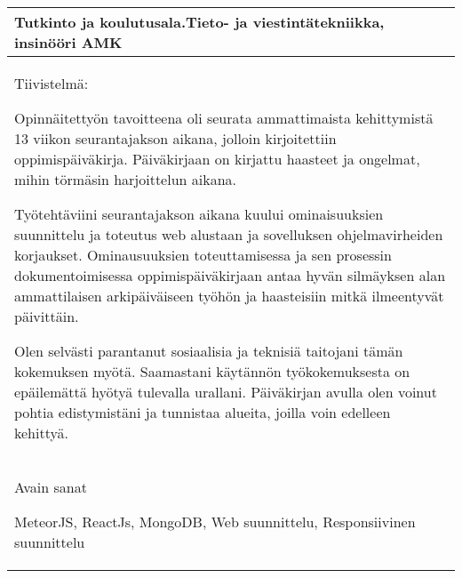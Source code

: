 \begin{tabular}{ | l | }
    \begin{minipage}[t][1.5cm][t]{10cm}
    Tutkinto ja koulutusala.\newline  Tieto- ja viestintätekniikka, insinööri AMK  

    \end{minipage}\\ \hline

    \begin{minipage}[t][7.5cm][t]{14.5cm}
    Tiivistelmä: \medskip 
    
    Opinnäitettyön tavoitteena oli seurata ammattimaista kehittymistä 13 viikon seurantajakson aikana, 
        jolloin kirjoitettiin oppimispäiväkirja. Päiväkirjaan on kirjattu haasteet ja ongelmat, mihin törmäsin harjoittelun aikana. \medskip

    Työtehtäviini seurantajakson aikana kuului 
        ominaisuuksien suunnittelu ja toteutus web alustaan ja sovelluksen ohjelmavirheiden korjaukset.
        Ominausuuksien toteuttamisessa ja sen prosessin dokumentoimisessa oppimispäiväkirjaan antaa hyvän silmäyksen alan ammattilaisen arkipäiväiseen työhön 
        ja haasteisiin mitkä ilmeentyvät päivittäin. \medskip

    Olen selvästi parantanut sosiaalisia ja teknisiä taitojani tämän kokemuksen myötä.
        Saamastani käytännön työkokemuksesta on epäilemättä hyötyä tulevalla urallani.
        Päiväkirjan avulla olen voinut pohtia edistymistäni ja tunnistaa alueita, joilla voin edelleen kehittyä. 

    \end{minipage}\\ \hline

    \begin{minipage}[t][2cm][t]{14cm}
    Avain sanat \medskip

    MeteorJS, ReactJs, MongoDB, Web suunnittelu, Responsiivinen suunnittelu
    \end{minipage}\\ \hline

\end{tabular}


\newpage


